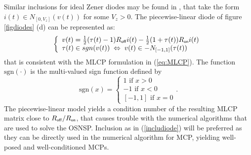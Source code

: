 Similar inclusions for ideal Zener diodes may be found in \cite{acary-brogliato2008,addi2009}, that take the form $i(t) \in N_{[0,V_{z}]}(v(t))$ for some $V_{z} >0$. The piecewise-linear  diode of figure \ref{figdiodes} (d) can be represented as:
\begin{equation}\label{includiode2}
\left\{\begin{array}{l}
v(t)=\frac{1}{2}(\tau(t)-1) R_\off i(t) -\frac{1}{2}(1+\tau(t)) R_\on i(t) \\
 \tau(t) \in \mbox{sgn}(v(t))\; \Leftrightarrow \; v(t) \in - N_{[-1,1]}(\tau(t))
\end{array}\right.
\end{equation}
that is consistent with the MLCP formulation in (\ref{eq:MLCP}). The function $\mbox{sgn}(\cdot)$ is the multi-valued sign function defined by
\begin{equation}
  \label{eq:sgn}
  \mbox{sgn}(x) =
  \begin{cases}
    1 \text{ if } x >0 \\
    -1 \text{ if } x <0 \\
    [-1,1] \text{ if } x =0
  \end{cases}.
\end{equation}
The piecewise-linear model yields a condition number of the resulting MLCP matrix close to $R_\off/R_\on$, that causes trouble with the numerical algorithms that are used to solve the OSNSP. Inclusion as in (\ref{includiode}) will be preferred as they can be directly used in the numerical algorithm for MCP, yielding well-posed and well-conditioned MCPs. 



